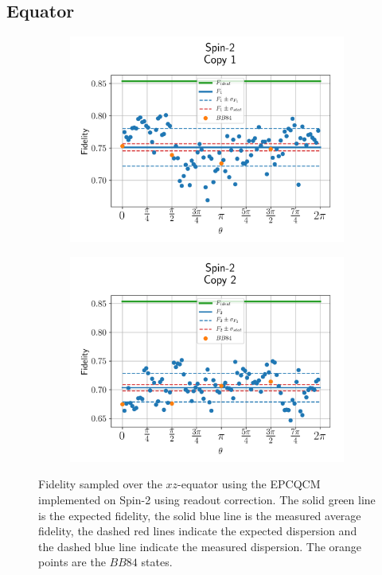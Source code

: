 \subsection{Equator}

\begin{figure}[H]
  \centering
  \begin{subfigure}{.5\textwidth}
    \centering
    \includegraphics[width=\textwidth]{Figures/Economical/Spin2/OnlyEquator/results_spin2_copy1.png}
    \label{fig:epc_uncorrected_spin2_equator_1}
  \end{subfigure}%
  \begin{subfigure}{.5\textwidth}
    \centering
    \includegraphics[width=\textwidth]{Figures/Economical/Spin2/OnlyEquator/results_spin2_copy2.png}
    \label{fig:epc_uncorrected_spin2_equator_2}
  \end{subfigure}
  \vspace{-0.5cm}
  \caption{Fidelity sampled over the $xz$-equator using the EPCQCM implemented on Spin-2 using readout correction.
  The solid green line is the expected fidelity, the solid blue line is the measured average fidelity, the dashed red lines indicate the expected dispersion and the dashed blue line indicate the measured dispersion. The orange points are the $BB84$ states.}
  \label{fig:epc_uncorrected_spin2_equator}
\end{figure}

